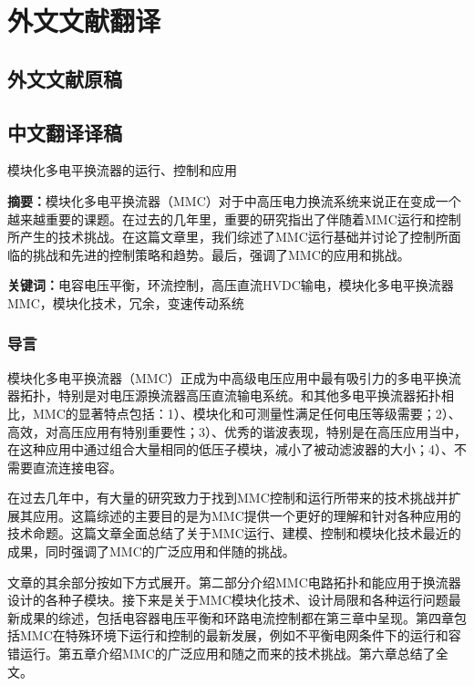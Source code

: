\chapter{外文文献翻译}
  \section{外文文献原稿}

  

  \section{中文翻译译稿}
  
  模块化多电平换流器的运行、控制和应用
  
  \textbf{摘要：}\quad  模块化多电平换流器（MMC）对于中高压电力换流系统来说正在变成一个越来越重要的课题。在过去的几年里，重要的研究指出了伴随着MMC运行和控制所产生的技术挑战。在这篇文章里，我们综述了MMC运行基础并讨论了控制所面临的挑战和先进的控制策略和趋势。最后，强调了MMC的应用和挑战。
  
  \textbf{关键词：}\quad 电容电压平衡，环流控制，高压直流{HVDC}输电，模块化多电平换流器{MMC}，模块化技术，冗余，变速传动系统
  
  \subsection{导言}
  
  模块化多电平换流器（MMC）正成为中高级电压应用中最有吸引力的多电平换流器拓扑，特别是对电压源换流器高压直流输电系统。和其他多电平换流器拓扑相比，MMC的显著特点包括：1）、模块化和可测量性满足任何电压等级需要；2）、高效，对高压应用有特别重要性；3）、优秀的谐波表现，特别是在高压应用当中，在这种应用中通过组合大量相同的低压子模块，减小了被动滤波器的大小；4）、不需要直流连接电容。
  
  在过去几年中，有大量的研究致力于找到MMC控制和运行所带来的技术挑战并扩展其应用。这篇综述的主要目的是为MMC提供一个更好的理解和针对各种应用的技术命题。这篇文章全面总结了关于MMC运行、建模、控制和模块化技术最近的成果，同时强调了MMC的广泛应用和伴随的挑战。
  
  文章的其余部分按如下方式展开。第二部分介绍MMC电路拓扑和能应用于换流器设计的各种子模块。接下来是关于MMC模块化技术、设计局限和各种运行问题最新成果的综述，包括电容器电压平衡和环路电流控制都在第三章中呈现。第四章包括MMC在特殊环境下运行和控制的最新发展，例如不平衡电网条件下的运行和容错运行。第五章介绍MMC的广泛应用和随之而来的技术挑战。第六章总结了全文。
  
